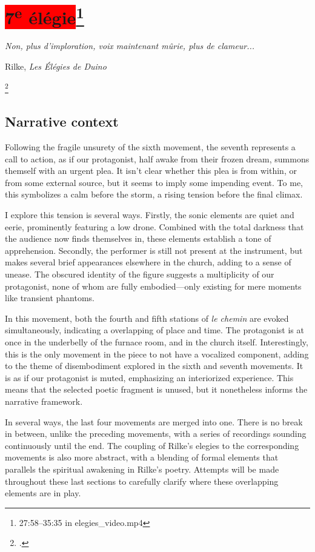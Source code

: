 \documentclass[12pt,twoside,maitrise]{dms_ks}
\theoremstyle{definition}
\begin{document}
{\section{\colorbox{red}{7\textsuperscript{e} élégie}\footnote{27:58--35:35 in elegies\_video.mp4}}

\epigraph{\textit{Non, plus d’imploration, voix maintenant mûrie, plus de clameur...}}{Rilke, \textit{Les Élégies de Duino}\protect\footnotemark}

\footcitetext[63]{rilke_egies_1986}

\subsection{Narrative context}

Following the fragile unsurety of the sixth movement, the seventh represents a call to action, as if our protagonist, half awake from their frozen dream, summons themself with an urgent plea. 
It isn’t clear whether this plea is from within, or from some external source, but it seems to imply some impending event. 
To me, this symbolizes a calm before the storm, a rising tension before the final climax. 

I explore this tension is several ways. 
Firstly, the sonic elements are quiet and eerie, prominently featuring a low drone. 
Combined with the total darkness that the audience now finds themselves in, these elements establish a tone of apprehension.
Secondly, the performer is still not present at the instrument, but makes several brief appearances elsewhere in the church, adding to a sense of unease. 
The obscured identity of the figure suggests a multiplicity of our protagonist, none of whom are fully embodied---only existing for mere moments like transient phantoms.

In this movement, both the fourth and fifth stations of \textit{le chemin} are evoked simultaneously, indicating a overlapping of place and time. 
The protagonist is at once in the underbelly of the furnace room, and in the church itself. 
Interestingly, this is the only movement in the piece to not have a vocalized component, adding to the theme of disembodiment explored in the sixth and seventh movements.
It is as if our protagonist is muted, emphasizing an interiorized experience.
This means that the selected poetic fragment is unused, but it nonetheless informs the narrative framework. 

In several ways, the last four movements are merged into one. 
There is no break in between, unlike the preceding movements, with a series of recordings sounding continuously until the end. 
The coupling of Rilke's elegies to the corresponding movements is also more abstract, with a blending of formal elements that parallels the spiritual awakening in Rilke’s poetry. 
Attempts will be made throughout these last sections to carefully clarify where these overlapping elements are in play.

}
\end{document}
